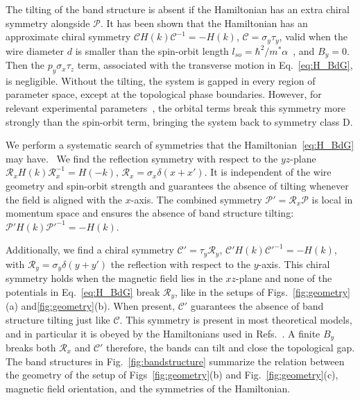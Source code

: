 
The tilting of the band structure is absent if the Hamiltonian has an extra chiral symmetry alongside $\mathcal{P}$.
It has been shown that the Hamiltonian has an approximate chiral symmetry $\mathcal{C}H\left(k\right)\mathcal{C}^{-1}=-H\left(k\right)$, $\mathcal{C}=\sigma_y \tau_y$, valid when the wire diameter $d$ is smaller than the spin-orbit length $l_{so}=\hbar^{2}/m^{*}\alpha$~\cite{Tewari2012,Diez2012}, and $B_y=0$.
Then the $p_{y}\sigma_x \tau_z$ term, associated with the transverse motion in Eq.~\eqref{eq:H_BdG}, is negligible.
Without the tilting, the system is gapped in every region of parameter space, except at the topological phase boundaries.
However, for relevant experimental parameters~\cite{Mourik2012}, the orbital terms break this symmetry more strongly than the spin-orbit term, bringing the system back to symmetry class D.


We perform a systematic search of symmetries that the Hamiltonian~\eqref{eq:H_BdG} may have.~\cite{Varjas2018}
We find the reflection symmetry with respect to the $yz$-plane $\mathcal{R}_x H\left(k\right)\mathcal{R}_x^{-1}=H\left(-k\right)$, $\mathcal{R}_x=\sigma_x\delta(x+x')$.
It is independent of the wire geometry and spin-orbit strength and guarantees the absence of tilting whenever the field is aligned with the $x$-axis.
The combined symmetry $\mathcal{P}' = \mathcal{R}_x \mathcal{P}$ is local in momentum space and ensures the absence of band structure tilting: $\mathcal{P}' H(k) \mathcal{P}'^{-1} = -H(k)$.


Additionally, we find a chiral symmetry $\mathcal{C}'=\tau_y\mathcal{R}_y$, $\mathcal{C}'H\left(k\right)\mathcal{C}'^{-1}=-H\left(k\right)$, with $\mathcal{R}_y = \sigma_y \delta(y + y')$ the reflection with respect to the $y$-axis.
This chiral symmetry holds when the magnetic field lies in the $xz$-plane and none of the potentials in Eq.~\eqref{eq:H_BdG} break $\mathcal{R}_y$, like in the setups of Figs.~\ref{fig:geometry}(a) and\ref{fig:geometry}(b).
When present, $\mathcal{C}'$ guarantees the absence of band structure tilting just like $\mathcal{C}$.
This symmetry is present in most theoretical models, and in particular it is obeyed by the Hamiltonians used in Refs.~\cite{Osca2015,Lim2013,Lim2012}.
A finite $B_y$ breaks both $\mathcal{R}_x$ and $\mathcal{C}'$ therefore, the bands can tilt and close the topological gap.
The band structures in Fig.~\ref{fig:bandstructure} summarize the relation between the geometry of the setup of Figs~\ref{fig:geometry}(b) and Fig.~\ref{fig:geometry}(c), magnetic field orientation, and the symmetries of the Hamiltonian.

